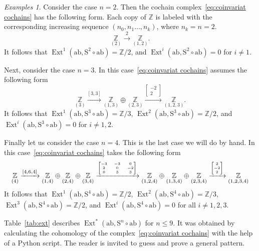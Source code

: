 \documentclass[psamsfonts]{amsart}
\theoremstyle{plain}
\theoremstyle{definition}
\theoremstyle{remark}
\newtheorem{exmps}[thm]{Examples}
\newcommand{\Z}{\mathbb{Z}}
\newcommand{\abelianization}{\mathrm{ab}}
\newcommand{\symm}{\mathrm{S}}
\DeclareMathOperator{\ext}{Ext}
\begin{document}
\begin{exmps}
Consider the case $n=2$. Then the cochain complex~\eqref{eq:coinvariat cochains} has the following form. Each copy of $\Z$ is labeled with the corresponding increasing sequence $(n_0, n_1\ldots, n_k)$, where $n_k=n=2$.
\[
\underset{(2)}{\Z}\xrightarrow{2}\underset{(1,2)}{\Z}.
\]
It follows that $\ext^1(\abelianization, \symm^2\circ \abelianization)=\Z/2$, and $\ext^i(\abelianization, \symm^2\circ \abelianization)=0$ for $i\ne 1$.

Next, consider the case $n=3$. In this case~\eqref{eq:coinvariat cochains} assumes the following form
\[
\underset{(3)}{\Z}\xrightarrow{[3, 3]}\underset{(1,3)}{\Z}\oplus \underset{(2,3)}{\Z} \xrightarrow{\begin{bmatrix} -2 \\2\end{bmatrix}} \underset{(1,2,3)}{\Z}.
\]
It follows that $\ext^1(\abelianization, \symm^3 \circ \abelianization)=\Z/3$, $\ext^2(\abelianization, \symm^3 \circ \abelianization)=\Z/2$, and $\ext^i(\abelianization, \symm^3 \circ \abelianization)=0$ for $i\ne 1, 2$.

Finally let us consider the case $n=4$. This is the last case we will do by hand. In this case~\eqref{eq:coinvariat cochains} takes the following form
\[
\underset{(4)}{\Z}\xrightarrow{\tiny[4,6,4]} \underset{(1, 4)}{\Z}\oplus \underset{(2, 4)}{\Z}\oplus \underset{(3,4)}{\Z}\xrightarrow{\tiny\begin{bmatrix}
    -3 & -3 & 0\\
    2 & 0 & -2\\
    0 & 3 & 3 
\end{bmatrix}} \underset{(1,2,4)}{\Z}\oplus \underset{(1,3,4)}{\Z}\oplus \underset{(2,3,4)}{\Z} \xrightarrow{\tiny\begin{bmatrix}
    2\\-2\\2
\end{bmatrix}} \underset{(1,2,3,4)}{\Z}
\]
It follows that $\ext^1(\abelianization, \symm^4\circ\abelianization)=\Z/2$, $\ext^2(\abelianization, \symm^4\circ\abelianization)=\Z/3$, $\ext^3(\abelianization, \symm^4\circ\abelianization)=\Z/2$, and $\ext^i(\abelianization, \symm^4\circ\abelianization)=0$ for all $i\ne 1,2,3$.

Table~\ref{tab:ext} describes $\ext^*(\abelianization, \symm^n\circ\abelianization)$ for $n\le 9$. It was obtained by calculating the cohomology of the complex~\eqref{eq:coinvariat cochains} with the help of a Python script. The reader is invited to guess and prove a general pattern.


\end{exmps}
\end{document}
